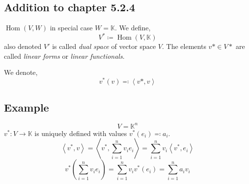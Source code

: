 \documentclass[a4paper,landscape,twocolumn]{article}
\newcommand\functional[1]{\left\langle{#1}\right\rangle}
\theoremstyle{definition}
\DeclareMathOperator\Hom{Hom} %
\begin{document}
\subsection[Addition to chapter 5.2.4]{Addition to chapter 5.2.4}

%
$\Hom(V,W)$ in special case $W = \mathbb K$. We define,
\[ V^* \coloneqq \Hom(V,\mathbb K) \]
also denoted $V'$ is called \emph{dual space} of vector space $V$.
The elements $v* \in V*$ are called \emph{linear forms} or \emph{linear functionals}.

We denote,
\[ v^*(v) \eqqcolon \functional{v*,v} \]

\subsection{Example}
\[ V = \mathbb K^n \]
$v^*: V \to \mathbb K$ is uniquely defined with values $v^*(e_i) \eqqcolon a_i$.
\[ \functional{v^*,v} = \functional{v^*, \sum_{i=1}^n v_i e_i} = \sum_{i=1}^n v_i \functional{v^*,e_i} \]
\[ v^*\left(\sum_{i=1}^n v_i e_i\right) = \sum_{i=1}^n v_i v^*(e_i) = \sum_{i=1}^n a_i v_i \]
\end{document}

